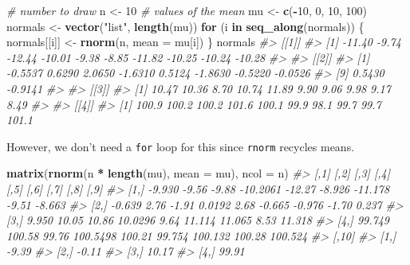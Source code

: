 \documentclass[]{book}
\newenvironment{Shaded}{\begin{snugshade}}{\end{snugshade}}
\newcommand{\CommentTok}[1]{\textcolor[rgb]{0.56,0.35,0.01}{\textit{#1}}}
\newcommand{\ControlFlowTok}[1]{\textcolor[rgb]{0.13,0.29,0.53}{\textbf{#1}}}
\newcommand{\DataTypeTok}[1]{\textcolor[rgb]{0.13,0.29,0.53}{#1}}
\newcommand{\DecValTok}[1]{\textcolor[rgb]{0.00,0.00,0.81}{#1}}
\newcommand{\KeywordTok}[1]{\textcolor[rgb]{0.13,0.29,0.53}{\textbf{#1}}}
\newcommand{\NormalTok}[1]{#1}
\newcommand{\OperatorTok}[1]{\textcolor[rgb]{0.81,0.36,0.00}{\textbf{#1}}}
\newcommand{\StringTok}[1]{\textcolor[rgb]{0.31,0.60,0.02}{#1}}
\theoremstyle{definition}
\theoremstyle{definition}
\theoremstyle{definition}
\theoremstyle{remark}
\begin{document}
\begin{Shaded}
\begin{Highlighting}[]

\CommentTok{# number to draw}
\NormalTok{n <-}\StringTok{ }\DecValTok{10}
\CommentTok{# values of the mean}
\NormalTok{mu <-}\StringTok{ }\KeywordTok{c}\NormalTok{(}\OperatorTok{-}\DecValTok{10}\NormalTok{, }\DecValTok{0}\NormalTok{, }\DecValTok{10}\NormalTok{, }\DecValTok{100}\NormalTok{)}
\NormalTok{normals <-}\StringTok{ }\KeywordTok{vector}\NormalTok{(}\StringTok{"list"}\NormalTok{, }\KeywordTok{length}\NormalTok{(mu))}
\ControlFlowTok{for}\NormalTok{ (i }\ControlFlowTok{in} \KeywordTok{seq_along}\NormalTok{(normals)) \{}
\NormalTok{  normals[[i]] <-}\StringTok{ }\KeywordTok{rnorm}\NormalTok{(n, }\DataTypeTok{mean =}\NormalTok{ mu[i])}
\NormalTok{\}}
\NormalTok{normals}
\CommentTok{#> [[1]]}
\CommentTok{#>  [1] -11.40  -9.74 -12.44 -10.01  -9.38  -8.85 -11.82 -10.25 -10.24 -10.28}
\CommentTok{#> }
\CommentTok{#> [[2]]}
\CommentTok{#>  [1] -0.5537  0.6290  2.0650 -1.6310  0.5124 -1.8630 -0.5220 -0.0526}
\CommentTok{#>  [9]  0.5430 -0.9141}
\CommentTok{#> }
\CommentTok{#> [[3]]}
\CommentTok{#>  [1] 10.47 10.36  8.70 10.74 11.89  9.90  9.06  9.98  9.17  8.49}
\CommentTok{#> }
\CommentTok{#> [[4]]}
\CommentTok{#>  [1] 100.9 100.2 100.2 101.6 100.1  99.9  98.1  99.7  99.7 101.1}
\end{Highlighting}
\end{Shaded}

However, we don't need a \texttt{for} loop for this since \texttt{rnorm}
recycles means.

\begin{Shaded}
\begin{Highlighting}[]
\KeywordTok{matrix}\NormalTok{(}\KeywordTok{rnorm}\NormalTok{(n }\OperatorTok{*}\StringTok{ }\KeywordTok{length}\NormalTok{(mu), }\DataTypeTok{mean =}\NormalTok{ mu), }\DataTypeTok{ncol =}\NormalTok{ n)}
\CommentTok{#>        [,1]   [,2]  [,3]     [,4]   [,5]   [,6]    [,7]   [,8]    [,9]}
\CommentTok{#> [1,] -9.930  -9.56 -9.88 -10.2061 -12.27 -8.926 -11.178  -9.51  -8.663}
\CommentTok{#> [2,] -0.639   2.76 -1.91   0.0192   2.68 -0.665  -0.976  -1.70   0.237}
\CommentTok{#> [3,]  9.950  10.05 10.86  10.0296   9.64 11.114  11.065   8.53  11.318}
\CommentTok{#> [4,] 99.749 100.58 99.76 100.5498 100.21 99.754 100.132 100.28 100.524}
\CommentTok{#>      [,10]}
\CommentTok{#> [1,] -9.39}
\CommentTok{#> [2,] -0.11}
\CommentTok{#> [3,] 10.17}
\CommentTok{#> [4,] 99.91}
\end{Highlighting}
\end{Shaded}
\end{document}
